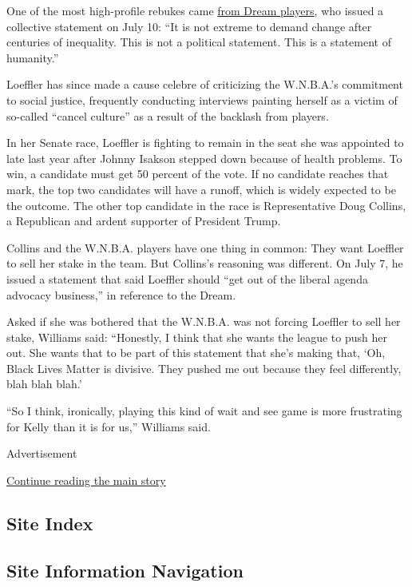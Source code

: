 One of the most high-profile rebukes came
\href{https://twitter.com/moniquebillings/status/1281713112949850113?s=21}{from
Dream players}, who issued a collective statement on July 10: ``It is
not extreme to demand change after centuries of inequality. This is not
a political statement. This is a statement of humanity.''

Loeffler has since made a cause celebre of criticizing the W.N.B.A.'s
commitment to social justice, frequently conducting interviews painting
herself as a victim of so-called ``cancel culture'' as a result of the
backlash from players.

In her Senate race, Loeffler is fighting to remain in the seat she was
appointed to late last year after Johnny Isakson stepped down because of
health problems. To win, a candidate must get 50 percent of the vote. If
no candidate reaches that mark, the top two candidates will have a
runoff, which is widely expected to be the outcome. The other top
candidate in the race is Representative Doug Collins, a Republican and
ardent supporter of President Trump.

Collins and the W.N.B.A. players have one thing in common: They want
Loeffler to sell her stake in the team. But Collins's reasoning was
different. On July 7, he issued a statement that said Loeffler should
``get out of the liberal agenda advocacy business,'' in reference to the
Dream.

Asked if she was bothered that the W.N.B.A. was not forcing Loeffler to
sell her stake, Williams said: ``Honestly, I think that she wants the
league to push her out. She wants that to be part of this statement that
she's making that, `Oh, Black Lives Matter is divisive. They pushed me
out because they feel differently, blah blah blah.'

``So I think, ironically, playing this kind of wait and see game is more
frustrating for Kelly than it is for us,'' Williams said.

Advertisement

\protect\hyperlink{after-bottom}{Continue reading the main story}

\hypertarget{site-index}{%
\subsection{Site Index}\label{site-index}}

\hypertarget{site-information-navigation}{%
\subsection{Site Information
Navigation}\label{site-information-navigation}}

